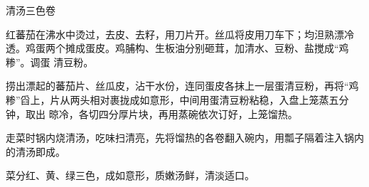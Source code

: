%
%
%
%
%
%
%
\begin{recipe}[三色如意卷]{清汤三色卷}

\ingredients


\preparation

\step 红蕃茄在沸水中烫过，去皮、去籽，用刀片开。丝瓜将皮用刀车下；均泹熟漂冷
透。鸡蛋两个摊成蛋皮。鸡脯构、生板油分别砸茸，加清水、豆粉、盐搅成“鸡糁”。调蛋
清豆粉。

\step 捞出漂起的蕃茄片、丝瓜皮，沾干水份，连同蛋皮各抹上一层蛋清豆粉，再将“鸡
糁”舀上，片从两头相对裹拢成如意形，中间用蛋清豆粉粘稳，入盘上笼蒸五分钟，取出
晾冷，各切四分厚片块，再用蒸碗依次订好，上笼馏热。

\step 走菜时锅内烧清汤，吃味扫清亮，先将馏热的各卷翻入碗内，用瓢子隔着注入锅内
的清汤即成。

\features

菜分红、黄、绿三色，成如意形，质嫩汤鲜，清淡适口。

\end{recipe}

